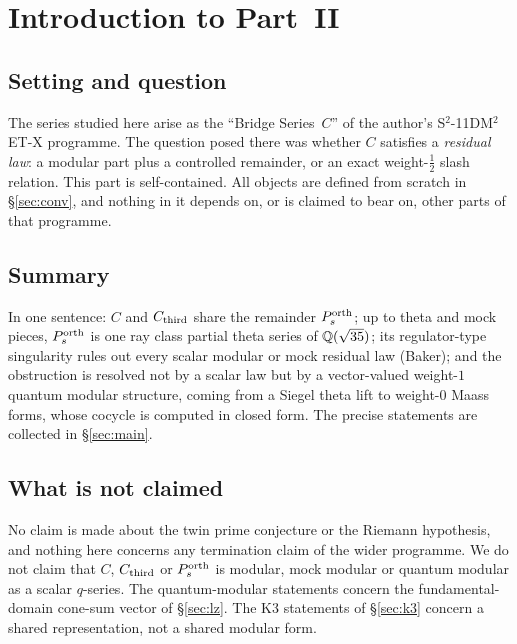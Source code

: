 

\section{Introduction to Part~II}\label{sec:intro}

\subsection{Setting and question}
The series studied here arise as the ``Bridge Series~$C$'' of the author's S$^2$-11DM$^2$ET-X programme. The question posed there was whether $C$
satisfies a \emph{residual law}: a modular part plus a controlled remainder, or an exact weight-$\tfrac12$ slash relation. This part is self-contained.
All objects are defined from scratch in \S\ref{sec:conv}, and nothing in it depends on, or is claimed to bear on, other parts of that programme.

\subsection{Summary}
In one sentence: $C$ and $C_{\mathrm{third}}$ share the remainder $P^{\mathrm{orth}}_s$; up to theta and mock pieces, $P^{\mathrm{orth}}_s$ is one ray class partial theta series of
$\mathbb{Q}(\sqrt{35})$; its regulator-type singularity rules out every scalar modular or mock residual law (Baker); and the obstruction is resolved not by a
scalar law but by a vector-valued weight-$1$ quantum modular structure, coming from a Siegel theta lift to weight-$0$ Maass forms, whose cocycle is
computed in closed form. The precise statements are collected in \S\ref{sec:main}.

\subsection{What is not claimed}
No claim is made about the twin prime conjecture or the Riemann hypothesis, and nothing here concerns any termination claim of the wider programme.
We do not claim that $C$, $C_{\mathrm{third}}$ or $P^{\mathrm{orth}}_s$ is modular, mock modular or quantum modular as a scalar $q$-series. The quantum-modular statements concern
the fundamental-domain cone-sum vector of \S\ref{sec:lz}. The K3 statements of \S\ref{sec:k3} concern a shared representation, not a shared modular form.


